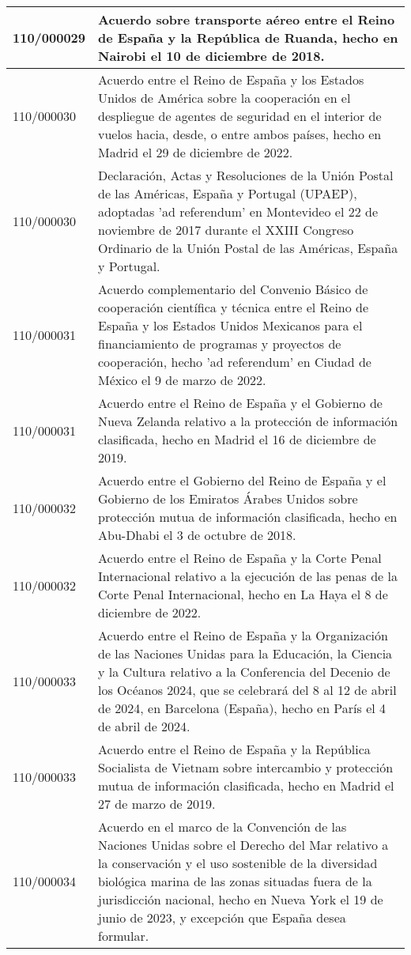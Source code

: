 {\begin{table}[H]
\begin{center}
\begin{tabularx}{\linewidth}{| l | X |}
\hline
110/000029 & Acuerdo sobre transporte aéreo entre el Reino de España y la República de Ruanda, hecho en Nairobi el 10 de diciembre de 2018. \\
\hline
110/000030 & Acuerdo entre el Reino de España y los Estados Unidos de América sobre la cooperación en el despliegue de agentes de seguridad en el interior de vuelos hacia, desde, o entre ambos países, hecho en Madrid el 29 de diciembre de 2022. \\
\hline
110/000030 & Declaración, Actas y Resoluciones de la Unión Postal de las Américas, España y Portugal (UPAEP), adoptadas 'ad referendum' en Montevideo el 22 de noviembre de 2017 durante el XXIII Congreso Ordinario de la Unión Postal de las Américas, España y Portugal. \\
\hline
110/000031 & Acuerdo complementario del Convenio Básico de cooperación científica y técnica entre el Reino de España y los Estados Unidos Mexicanos para el financiamiento de programas y proyectos de cooperación, hecho 'ad referendum' en Ciudad de México el 9 de marzo de 2022. \\
\hline
110/000031 & Acuerdo entre el Reino de España y el Gobierno de Nueva Zelanda relativo a la protección de información clasificada, hecho en Madrid el 16 de diciembre de 2019. \\
\hline
110/000032 & Acuerdo entre el Gobierno del Reino de España y el Gobierno de los Emiratos Árabes Unidos sobre protección mutua de información clasificada, hecho en Abu-Dhabi el 3 de octubre de 2018. \\
\hline
110/000032 & Acuerdo entre el Reino de España y la Corte Penal Internacional relativo a la ejecución de las penas de la Corte Penal Internacional, hecho en La Haya el 8 de diciembre de 2022. \\
\hline
110/000033 & Acuerdo entre el Reino de España y la Organización de las Naciones Unidas para la Educación, la Ciencia y la Cultura relativo a la Conferencia del Decenio de los Océanos 2024, que se celebrará del 8 al 12 de abril de 2024, en Barcelona (España), hecho en París el 4 de abril de 2024. \\
\hline
110/000033 & Acuerdo entre el Reino de España y la República Socialista de Vietnam sobre intercambio y protección mutua de información clasificada, hecho en Madrid el 27 de marzo de 2019. \\
\hline
110/000034 & Acuerdo en el marco de la Convención de las Naciones Unidas sobre el Derecho del Mar relativo a la conservación y el uso sostenible de la diversidad biológica marina de las zonas situadas fuera de la jurisdicción nacional, hecho en Nueva York el 19 de junio de 2023, y excepción que España desea formular. \\

\end{tabularx}
\end{center}
\end{table}}
